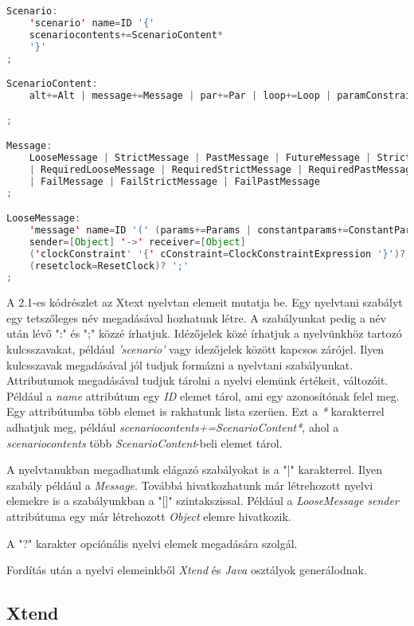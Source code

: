 \begin{lstlisting}[language=java, frame=single, float=ht!, caption={Xtext nyelvtan elemei.},captionpos=b]
Scenario:
	'scenario' name=ID '{'
	scenariocontents+=ScenarioContent*
	'}'
;

ScenarioContent:
	alt+=Alt | message+=Message | par+=Par | loop+=Loop | paramConstraint+=ParameterConstraint

;

Message:
	LooseMessage | StrictMessage | PastMessage | FutureMessage | StrictFutureMessage
	| RequiredLooseMessage | RequiredStrictMessage | RequiredPastMessage | RequiredFutureMessage | RequiredStrictFutureMessage
	| FailMessage | FailStrictMessage | FailPastMessage
;

LooseMessage:
	'message' name=ID '(' (params+=Params | constantparams+=ConstantParams) ')'
	sender=[Object] '->' receiver=[Object]
	('clockConstraint' '{' cConstraint=ClockConstraintExpression '}')? 
	(resetclock=ResetClock)? ';'
;
\end{lstlisting}

A 2.1-es kódrészlet az Xtext nyelvtan elemeit mutatja be.
Egy nyelvtani szabályt egy tetszőleges név megadásával hozhatunk létre.
A szabályunkat pedig a név után lévő ":" és ";" közzé írhatjuk.
Idézőjelek közé írhatjuk a nyelvünkhöz tartozó kulcsszavakat, például \textit{'scenario'} vagy idezőjelek között kapcsos zárójel.
Ilyen kulcsszavak megadásával jól tudjuk formázni a nyelvtani szabályunkat.
Attributumok megadásával tudjuk tárolni a nyelvi elemünk értékeit, változóit.
Például a \textit{name} attribútum egy \textit{ID} elemet tárol, ami egy azonosítónak felel meg.
Egy attribútumba több elemet is rakhatunk lista szerüen.
Ezt a \textit{*} karakterrel adhatjuk meg, például \textit{scenariocontents+=ScenarioContent*}, ahol a \textit{scenariocontents} több \textit{ScenarioContent}-beli elemet tárol.

A nyelvtanukban megadhatunk elágazó szabályokat is a "|" karakterrel.
Ilyen szabály például a \textit{Message}.
Továbbá hivatkozhatunk már létrehozott nyelvi elemekre is a szabályunkban a "[]" szintakszissal.
Például a \textit{LooseMessage} \textit{sender} attribútuma egy már létrehozott \textit{Object} elemre hivatkozik.

A "?" karakter opciónális nyelvi elemek megadására szolgál.

Fordítás után a nyelvi elemeinkből \textit{Xtend} és \textit{Java} osztályok generálodnak.

\subsection{Xtend}


